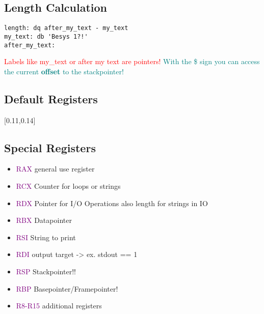 \documentclass[main.tex,fontsize=8pt,paper=a4,paper=landscape,DIV=calc,]{scrartcl}
\begin{document}
\begin{multicols*}{4}
\subsection{Length Calculation}
\vspace{-2.5mm}
\begin{lstlisting}
length: dq after_my_text - my_text
my_text: db 'Besys 1?!'
after_my_text:
\end{lstlisting}
\vspace{2mm}
\textcolor{red}{Labels like my\_text or after my text are pointers!}\newline
\textcolor{teal}{With the \$ sign you can access the current \textbf{offset} to the stackpointer!}

\subsection{Default Registers}
[0.11,0.14]

\subsection{Special Registers}
\begin{itemize}
  \item \textcolor{purple}{RAX} general use register
  \item \textcolor{purple}{RCX} Counter for loops or strings
  \item \textcolor{purple}{RDX} Pointer for I/O Operations\newline
    also length for strings in IO
  \item \textcolor{purple}{RBX} Datapointer
  \item \textcolor{purple}{RSI} String to print
  \item \textcolor{purple}{RDI} output target -> ex. stdout == 1
  \item \textcolor{purple}{RSP} Stackpointer!!
  \item \textcolor{purple}{RBP} Basepointer/Framepointer!
  \item \textcolor{purple}{R8-R15} additional registers
\end{itemize}


\end{multicols*}
\end{document}
